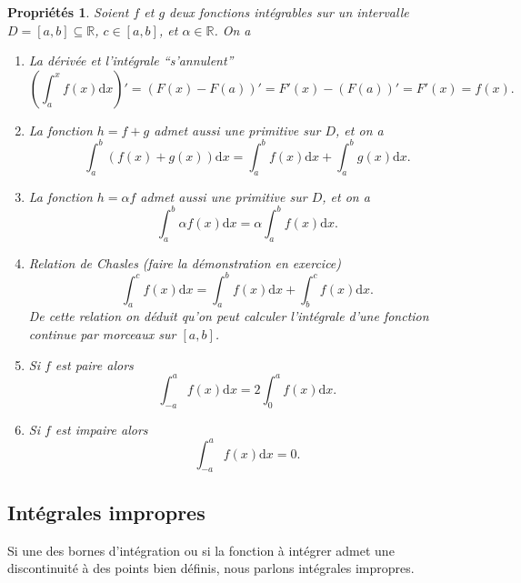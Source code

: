 \documentclass[a4paper,12pt]{book}
\newcommand{\real}{\mathbb{R}}
\newcommand{\dd}{\mathrm{d}}
\newtheorem{proprietes}{Propriétés}
\begin{document}
\begin{proprietes}
Soient $f$ et $g$ deux fonctions intégrables sur un intervalle $D=[a,b]\subseteq\real$, $c\in[a,b]$, et $\alpha\in\real$.
On a
\begin{enumerate}
 \item La dérivée et l'intégrale ``s'annulent'' 
 \begin{equation}
  \left(\int_a^x f(x)\dd x\right)'=\left(F(x)-F(a)\right)'=F'(x)-\left(F(a)\right)'=F'(x)=f(x).
 \end{equation}
 \item La fonction $h=f+g$ admet aussi une primitive sur $D$, et on a
 \begin{equation}
  \int_a^b(f(x)+g(x))\dd x=\int_a^b f(x)\dd x+\int_a^b g(x)\dd x.
 \end{equation}
 \item La fonction $h=\alpha f$ admet aussi une primitive sur $D$, et on a
 \begin{equation}
  \int_a^b\alpha f(x)\dd x=\alpha\int_a^b f(x)\dd x.
 \end{equation}
\item Relation de Chasles (faire la démonstration en exercice)
\begin{equation}
\int_a^c f(x)\dd x=\int_a^b f(x)\dd x+\int_b^c f(x)\dd x.
\end{equation}
De cette relation on déduit qu'on peut calculer l'intégrale d'une fonction
continue par morceaux sur $[a,b]$.
\item Si $f$ est paire alors
\begin{equation}
\int_{-a}^a f(x)\dd x = 2\int_0^a f(x)\dd x.
\end{equation}
\item Si $f$ est impaire alors
\begin{equation}
\int_{-a}^a f(x)\dd x = 0.
\end{equation}
\end{enumerate}
\end{proprietes}



\subsection{Intégrales impropres}

Si une des bornes d'intégration ou si la fonction à intégrer admet une discontinuité à des points bien définis, nous
parlons intégrales impropres.
\end{document}
